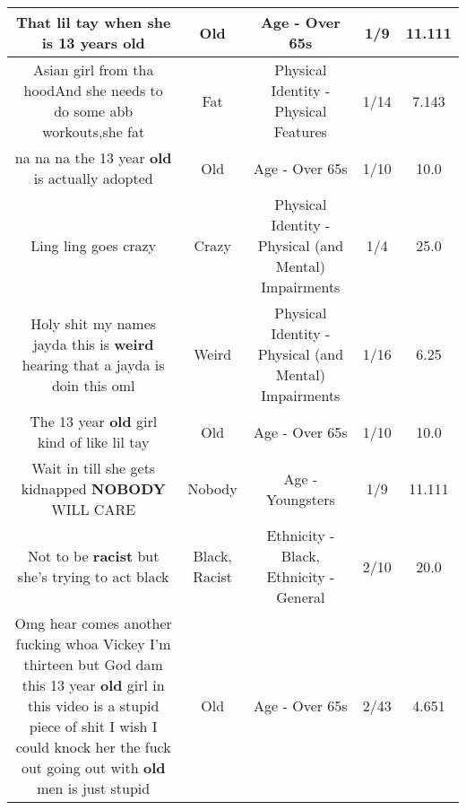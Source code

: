 \documentclass[11pt]{article}
\newlength\mylength
\begin{document}
\begin{center}
\begin{longtable}{|C{.65\mylength}|C{.30\mylength}|C{.12\mylength}|C{.12\mylength}|C{.12\mylength}|}
  \small That lil tay when she is 13 years old\normalsize   & Old & Age - Over 65s & 1/9 & 11.111 \\  \hline
  \small Asian girl from tha hoodAnd she needs to do some abb workouts,she fat\normalsize   & Fat & Physical Identity - Physical Features & 1/14 & 7.143 \\  \hline
  \small na na na the 13 year \textbf{old} is actually adopted\normalsize   & Old & Age - Over 65s & 1/10 & 10.0 \\  \hline
  \small Ling ling goes crazy\normalsize   & Crazy & Physical Identity - Physical (and Mental) Impairments & 1/4 & 25.0 \\  \hline
  \small Holy shit my names jayda this is \textbf{weird} hearing that a jayda is doin this oml\normalsize   & Weird & Physical Identity - Physical (and Mental) Impairments & 1/16 & 6.25 \\  \hline
  \small The 13 year \textbf{old} girl kind of like lil tay\normalsize   & Old & Age - Over 65s & 1/10 & 10.0 \\  \hline
  \small Wait in till she gets kidnapped \textbf{NOBODY} WILL CARE\normalsize   & Nobody & Age - Youngsters & 1/9 & 11.111 \\  \hline
  \small Not to be \textbf{racist} but she's trying to act black\normalsize   & Black, Racist & Ethnicity - Black, Ethnicity - General & 2/10 & 20.0 \\  \hline
  \small Omg hear comes another fucking whoa Vickey I'm thirteen but God dam this 13 year \textbf{old} girl in this video is a stupid piece of shit I wish I could knock her the fuck out going out with \textbf{old} men is just stupid\normalsize   & Old & Age - Over 65s & 2/43 & 4.651 \\  \hline

\end{longtable}
\end{center}
\end{document}
